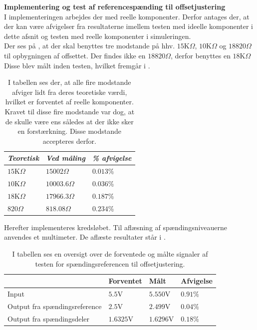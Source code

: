 \textbf{Implementering og test af referencespænding til offsetjustering}\\
I implementeringen arbejdes der med reelle komponenter. Derfor antages der, at der kan være afvigelser fra resultaterne imellem testen med ideelle komponenter i dette afsnit og testen med reelle komponenter i simuleringen. \\
Der ses på , at der skal benyttes tre modstande på hhv. $15$K$\Omega$, $10$K$\Omega$ og $18820 \Omega$  til opbygningen af offsettet. Der findes ikke en $18820 \Omega$, derfor benyttes en $18$K$ \Omega$  Disse blev målt inden testen, hvilket fremgår i .

\begin{table}[H]
	\centering
	\begin{tabular}{|l|l|l|}
		\hline
		\textit{Teoretisk} & \textit{Ved måling} & \textit{\% afvigelse} \\ \hline
		$15$K$\Omega$       & $15002\Omega$       & $0.013$\%               \\ \hline
		$10$K$\Omega$       & $10003.6\Omega$       & $0.036$\%               \\ \hline
		$18$K$\Omega$       & $17966.3 \Omega$       & $0.187$\%               \\ \hline
		$820 \Omega$       & $818.08 \Omega$       & $0.234$\%               \\ \hline
	\end{tabular}
	\caption{I tabellen ses der, at alle fire modstande afviger lidt fra deres teoretiske værdi, hvilket er forventet af reelle komponenter. Kravet til disse fire modstande var dog, at de skulle være ens således at der ikke sker en forstærkning. Disse modstande accepteres derfor.}
	\label{Tab:modstand_offset}
\end{table}

Herefter implementeres kredsløbet. Til aflæsning af spændingsniveauerne anvendes et multimeter. De aflæste resultater står i .
\begin{table}[]
\centering
\caption{I tabellen ses en oversigt over de forventede og målte signaler af testen for spændingsreferencen til offsetjustering.}
\label{Tab:SpaendingsRef_offset_test}
\begin{tabular}{|l|l|l|l|}
\hline
                              & Forventet & Målt      & Afvigelse \\ \hline
Input                         & $5.5$V    & $5.550$V  & $0.91 \%$ \\ \hline
Output fra spændingsreference & $2.5$V    & $2.499$V  & $0.04 \%$ \\ \hline
Output fra spændingsdeler     & $1.6325$V & $1.6296$V & $0.18 \%$ \\ \hline
\end{tabular}
\end{table}

